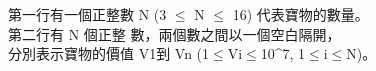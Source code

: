 第一行有一個正整數 N (3 $\leq$ N $\leq$ 16) 代表寶物的數量。\\
第二行有 N 個正整 數，兩個數之間以一個空白隔開，\\
分別表示寶物的價值 V1到 Vn (1$\leq$Vi$\leq$10^7, 1$\leq$i$\leq$N)。\\
